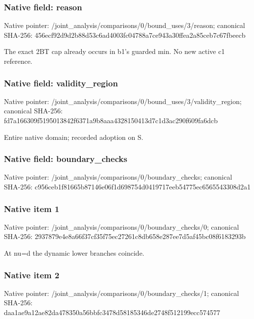 \documentclass[10pt,a4paper]{article}
\begin{document}
\subsubsection{Native field: reason}
Native pointer: /joint\_\allowbreak{}analysis/comparisons/0/bound\_\allowbreak{}uses/3/reason; canonical SHA-256: 456ecf92d9d2b88d53c6ad4003fc04788a7ce943a30ffea2a85ceb7c67fbeecb

\begingroup\raggedright\sloppy The exact 2BT cap already occurs in b1's guarded min. No new active c1 reference.\par\endgroup

\subsubsection{Native field: validity\_\allowbreak{}region}
Native pointer: /joint\_\allowbreak{}analysis/comparisons/0/bound\_\allowbreak{}uses/3/validity\_\allowbreak{}region; canonical SHA-256: fd7a166309f5195013842f6371a9b8aaa4328150413d7c1d3ac290f609fa6dcb

\begingroup\raggedright\sloppy Entire native domain;\allowbreak{} recorded adoption on S.\par\endgroup

\subsubsection{Native field: boundary\_\allowbreak{}checks}
Native pointer: /joint\_\allowbreak{}analysis/comparisons/0/boundary\_\allowbreak{}checks; canonical SHA-256: c956ceb1f81665b87146e06f1d698754d0419717eeb54775ec6565543308d2a1

\subsubsection{Native item 1}
Native pointer: /joint\_\allowbreak{}analysis/comparisons/0/boundary\_\allowbreak{}checks/0; canonical SHA-256: 2937879e4e8a66f37cf35f75ec27261c8db658e287ee7d5af45bc08f6183293b

\begingroup\raggedright\sloppy At nu=\allowbreak{}d the dynamic lower branches coincide.\par\endgroup

\subsubsection{Native item 2}
Native pointer: /joint\_\allowbreak{}analysis/comparisons/0/boundary\_\allowbreak{}checks/1; canonical SHA-256: daa1ae9a12ae82da478350a56bbfc3478d58185346de2748f512199ecc574577
\end{document}
